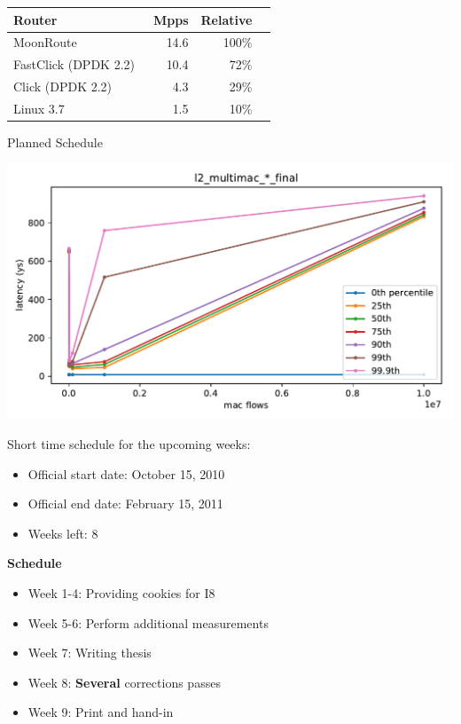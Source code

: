 \documentclass[a1paper,fontsize=24.88pt,twoside=false,english,DIV=calc,NET]{scrartcl}
\begin{document}
{{{	\vspace{5ex}
	\centering
	\begin{tabular}[]{ l r r r}
		\footnotesize
		Router                                      & Mpps & Relative \\
		\midrule
		MoonRoute                                   & 14.6 & 100\%    \\
		FastClick (DPDK 2.2)~\cite{moongen-imc2015} & 10.4 & 72\%     \\
		Click (DPDK 2.2)~\cite{moongen-imc2015}     & 4.3  & 29\%     \\
		Linux 3.7                                   & 1.5  & 10\%
	\end{tabular}

}
{Planned Schedule}{

	\vspace{-2ex}
	\includegraphics[width=.95\linewidth]{../../statistics/latency_l2_multimac_}

	\footnotesize
	Short time schedule for the upcoming weeks:

	\begin{itemize}
		\item Official start date: October 15, 2010
		\item Official end date: February 15, 2011
		\item Weeks left: 8
	\end{itemize}
	
	\textbf{Schedule}
	\begin{itemize}
		\item Week 1-4: Providing cookies for I8
		\item Week 5-6: Perform additional measurements
		\item Week 7: Writing thesis
		\item Week 8: \textbf{Several} corrections passes
		\item Week 9: Print and hand-in
	\end{itemize}
}

}}
\end{document}
